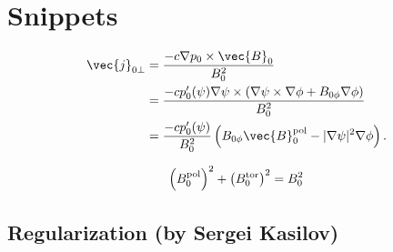 \section{Snippets}

\begin{align}
  \vec{j}_{0 \perp} &= \frac{-c \nabla p_{0} \times \vec{B}_{0}}{B_{0}^{2}} \\
  &= \frac{-c p_{0}' (\psi) \nabla \psi \times (\nabla \psi \times \nabla \phi + B_{0 \phi} \nabla \phi)}{B_{0}^{2}} \nonumber \\
  &= \frac{-c p_{0}' (\psi)}{B_{0}^{2}} \left( B_{0 \phi} \vec{B}_{0}^{\pol} - \lvert \nabla \psi \rvert^{2} \nabla \phi \right).
\end{align}

\begin{gather}
  \left( B_{0}^{\textrm{pol}} \right)^{2} + \left( B_{0}^{\textrm{tor}} \right)^{2} = B_{0}^{2}
\end{gather}

\subsection{Regularization (by Sergei Kasilov)}


